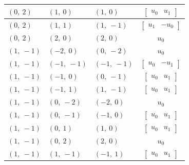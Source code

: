 \documentclass[11pt]{article}
\theoremstyle{definition}
\begin{document}
\begin{longtable}{|l|l|l|c|}
    \hline
    $\left( 0, \  2\right)$ & $\left( 1, \  0\right)$ & $\left( 1, \  0\right)$ & $\left[\begin{matrix}u_{0} & u_{1}\end{matrix}\right]$ \\
    \hline
    $\left( 0, \  2\right)$ & $\left( 1, \  1\right)$ & $\left( 1, \  -1\right)$ & $\left[\begin{matrix}u_{1} & - u_{0}\end{matrix}\right]$ \\
    \hline
    $\left( 0, \  2\right)$ & $\left( 2, \  0\right)$ & $\left( 2, \  0\right)$ & $u_{0}$ \\
    \hline
    $\left( 1, \  -1\right)$ & $\left( -2, \  0\right)$ & $\left( 0, \  -2\right)$ & $u_{0}$ \\
    \hline
    $\left( 1, \  -1\right)$ & $\left( -1, \  -1\right)$ & $\left( -1, \  -1\right)$ & $\left[\begin{matrix}u_{0} & - u_{1}\end{matrix}\right]$ \\
    \hline
    $\left( 1, \  -1\right)$ & $\left( -1, \  0\right)$ & $\left( 0, \  -1\right)$ & $\left[\begin{matrix}u_{0} & u_{1}\end{matrix}\right]$ \\
    \hline
    $\left( 1, \  -1\right)$ & $\left( -1, \  1\right)$ & $\left( 1, \  -1\right)$ & $\left[\begin{matrix}u_{0} & u_{1}\end{matrix}\right]$ \\
    \hline
    $\left( 1, \  -1\right)$ & $\left( 0, \  -2\right)$ & $\left( -2, \  0\right)$ & $u_{0}$ \\
    \hline
    $\left( 1, \  -1\right)$ & $\left( 0, \  -1\right)$ & $\left( -1, \  0\right)$ & $\left[\begin{matrix}u_{0} & u_{1}\end{matrix}\right]$ \\
    \hline
    $\left( 1, \  -1\right)$ & $\left( 0, \  1\right)$ & $\left( 1, \  0\right)$ & $\left[\begin{matrix}u_{0} & u_{1}\end{matrix}\right]$ \\
    \hline
    $\left( 1, \  -1\right)$ & $\left( 0, \  2\right)$ & $\left( 2, \  0\right)$ & $u_{0}$ \\
    \hline
    $\left( 1, \  -1\right)$ & $\left( 1, \  -1\right)$ & $\left( -1, \  1\right)$ & $\left[\begin{matrix}u_{0} & u_{1}\end{matrix}\right]$ \\

\end{longtable}
\end{document}
